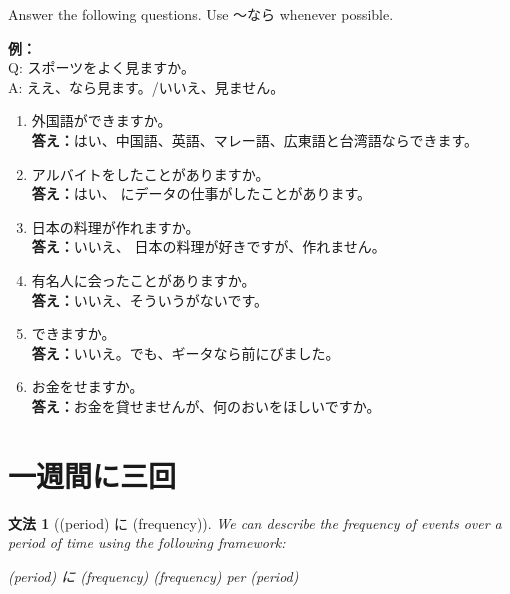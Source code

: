 \documentclass[notoc,notitlepage]{tufte-book}
\newtheorem{grammar}{文法}[section]
\begin{document}
\begin{ex}
  Answer the following questions. Use 〜なら whenever possible.

  \textbf{例：}\\
  \noindent Q: スポーツをよく見ますか。\\
  \noindent A: ええ、なら見ます。/いいえ、見ません。

  \begin{enumerate}
    \item 外国語ができますか。\\
      \textbf{答え：}はい、中国語、英語、マレー語、広東語と台湾語ならできます。 
    \item アルバイトをしたことがありますか。\\
      \textbf{答え：}はい、 にデータの仕事がしたことがあります。
    \item 日本の料理が作れますか。\\
      \textbf{答え：}いいえ、 日本の料理が好きですが、作れません。
    \item 有名人に会ったことがありますか。\\
      \textbf{答え：}いいえ、そういうがないです。 
    \item {}できますか。\\
      \textbf{答え：}いいえ。でも、ギータなら前にびました。 
    \item お金をせますか。\\
      \textbf{答え：}お金を貸せませんが、何のおいをほしいですか。 
  \end{enumerate}
\end{ex}


\section{一週間に三回}%
\label{sec:yi_zhou_jian_nisan_hui_}

\begin{grammar}[(period) に (frequency)]
\label{grammar:_period_ni_frequency_}
  We can describe the frequency of events over a period of time using the following framework:
  \begin{center}
    (period) に (frequency) \qquad (frequency) per (period)
  \end{center}
\end{grammar}
\end{document}
